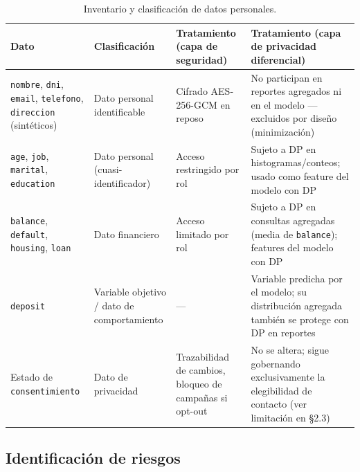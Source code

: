 \documentclass[11pt,a4paper]{article}
\begin{document}
\begin{table}[htbp]
\centering
\scriptsize
\begin{tabularx}{\textwidth}{@{}p{3cm}p{2.6cm}XX@{}}
\toprule
\textbf{Dato} & \textbf{Clasificación} & \textbf{Tratamiento (capa de seguridad)} &
\textbf{Tratamiento (capa de privacidad diferencial)} \\
\midrule
\texttt{nombre}, \texttt{dni}, \texttt{email}, \texttt{telefono}, \texttt{direccion} (sintéticos)
& Dato personal identificable &
Cifrado AES-256-GCM en reposo &
No participan en reportes agregados ni en el modelo --- excluidos por diseño (minimización) \\
\addlinespace
\texttt{age}, \texttt{job}, \texttt{marital}, \texttt{education} & Dato personal
(cuasi-identificador) &
Acceso restringido por rol &
Sujeto a DP en histogramas/conteos; usado como feature del modelo con DP \\
\addlinespace
\texttt{balance}, \texttt{default}, \texttt{housing}, \texttt{loan} & Dato financiero &
Acceso limitado por rol &
Sujeto a DP en consultas agregadas (media de \texttt{balance}); features del modelo con DP \\
\addlinespace
\texttt{deposit} & Variable objetivo / dato de comportamiento & --- &
Variable predicha por el modelo; su distribución agregada también se protege con DP en reportes \\
\addlinespace
Estado de \texttt{consentimiento} & Dato de privacidad &
Trazabilidad de cambios, bloqueo de campañas si opt-out &
No se altera; sigue gobernando exclusivamente la elegibilidad de contacto (ver limitación en
\S2.3) \\
\bottomrule
\end{tabularx}
\caption{Inventario y clasificación de datos personales.}
\end{table}

\subsection{Identificación de riesgos}
\end{document}
